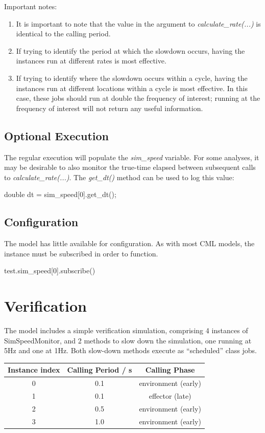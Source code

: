 \documentclass[11pt,fleqn]{report}
\begin{document}
Important notes:
\begin{enumerate}
\item It is important to note that the value in the argument to
      \textit{calculate\_rate(...)} is identical to the calling period.
\item If trying to identify the period at which the slowdown occurs, having the
      instances run at different rates is most effective.
\item If trying to identify where the slowdown occurs within a cycle, having
      the instances run at different locations within a cycle is most effective.
      In this case, these jobs should run at double the frequency of interest;
      running at the frequency of interest will not return any useful
      information.
\end{enumerate}

\section {Optional Execution}
The regular execution will populate the \textit{sim\_speed} variable. For some
analyses, it may be desirable to also monitor the true-time elapsed between
subsequent calls to \textit{calculate\_rate(...)}. The \textit{get\_dt()}
method can be used to log this value:

\begin{codeC}
double dt = sim_speed[0].get_dt();
\end{codeC}

\section {Configuration}
The model has little available for configuration. As with most CML models, the
instance must be subscribed in order to function.
\begin{codePython}
test.sim_speed[0].subscribe()
\end{codePython}

\chapter{Verification}
The model includes a simple verification simulation, comprising 4 instances of
SimSpeedMonitor, and 2 methods to slow down the simulation, one running at 5Hz
and one at 1Hz. Both slow-down methods execute as ``scheduled'' class jobs.

\begin{center}
\begin{tabular}{|c|c|c|}
\hline
 \textbf{Instance index} & \textbf{Calling Period / s} &
 \textbf{Calling Phase} \\ \hline
 \hline
0 & 0.1 & environment (early) \\ \hline
1 & 0.1 & effector (late)     \\ \hline
2 & 0.5 & environment (early) \\ \hline
3 & 1.0 & environment (early) \\ \hline
\end{tabular}
\end{center}
\end{document}
